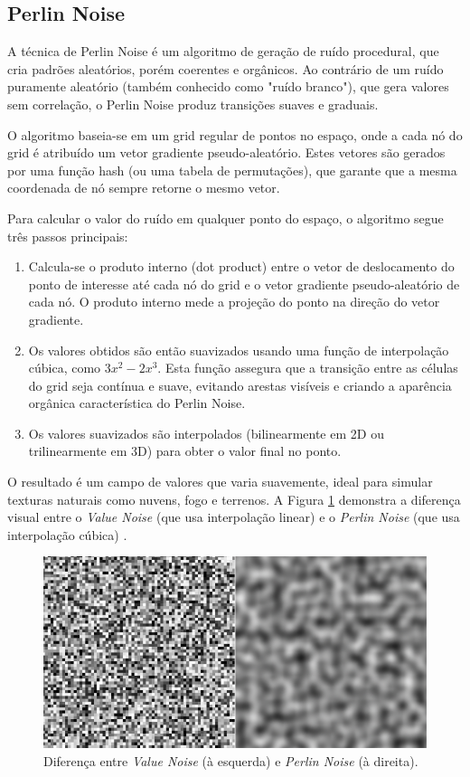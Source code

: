 \subsection{Perlin Noise}

A técnica de Perlin Noise é um algoritmo de geração de ruído procedural, que cria padrões aleatórios, porém coerentes e orgânicos. Ao contrário de um ruído puramente aleatório (também conhecido como "ruído branco"), que gera valores sem correlação, o Perlin Noise produz transições suaves e graduais.

O algoritmo baseia-se em um grid regular de pontos no espaço, onde a cada nó do grid é atribuído um vetor gradiente pseudo-aleatório. Estes vetores são gerados por uma função hash (ou uma tabela de permutações), que garante que a mesma coordenada de nó sempre retorne o mesmo vetor.

Para calcular o valor do ruído em qualquer ponto do espaço, o algoritmo segue três passos principais:
\begin{enumerate}
    \item Calcula-se o produto interno (dot product) entre o vetor de deslocamento do ponto de interesse até cada nó do grid e o vetor gradiente pseudo-aleatório de cada nó. O produto interno mede a projeção do ponto na direção do vetor gradiente.
    \item Os valores obtidos são então suavizados usando uma função de interpolação cúbica, como $3x^2 - 2x^3$. Esta função assegura que a transição entre as células do grid seja contínua e suave, evitando arestas visíveis e criando a aparência orgânica característica do Perlin Noise.
    \item Os valores suavizados são interpolados (bilinearmente em 2D ou trilinearmente em 3D) para obter o valor final no ponto.
\end{enumerate}

O resultado é um campo de valores que varia suavemente, ideal para simular texturas naturais como nuvens, fogo e terrenos. A Figura \ref{fig:whitenoise} demonstra a diferença visual entre o \textit{Value Noise} (que usa interpolação linear) e o \textit{Perlin Noise} (que usa interpolação cúbica) \cite{fractalNoise}.

\begin{figure}[H]
    \centering
    \includegraphics[width=0.8\linewidth]{img/noise-whitenoise.png}
    \caption{Diferença entre \textit{Value Noise} (à esquerda) e \textit{Perlin Noise} (à direita).}
    \label{fig:whitenoise}
\end{figure}

